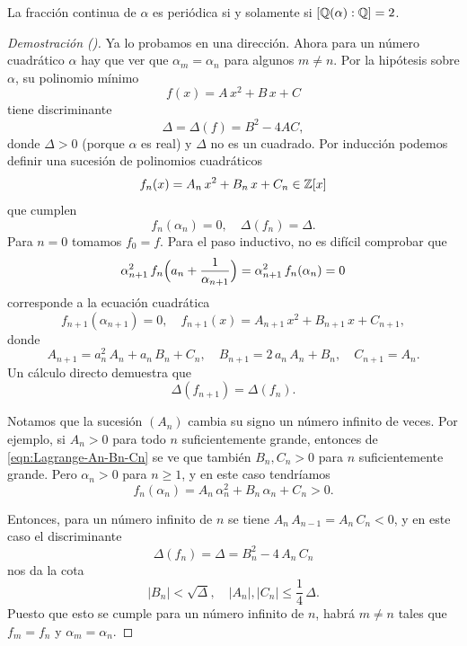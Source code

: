 \begin{teorema}[Lagrange]
  La fracción continua de $\alpha$ es periódica si y solamente si
  $[\mathbb{Q} (\alpha) : \mathbb{Q}] = 2$.

  \begin{proof}[Demostración (\cite{Steinig-1992})]
    Ya lo probamos en una dirección. Ahora para un número cuadrático $\alpha$
    hay que ver que $\alpha_m = \alpha_n$ para algunos $m \ne n$. Por la
    hipótesis sobre $\alpha$, su polinomio mínimo
    $$f (x) = A\,x^2 + B\,x + C$$
    tiene discriminante
    $$\Delta = \Delta (f) = B^2 - 4 A C,$$
    donde $\Delta > 0$ (porque $\alpha$ es real) y $\Delta$ no es un cuadrado.
    Por inducción podemos definir una sucesión de polinomios cuadráticos
    $$f_n (x) = A_n\,x^2 + B_n\,x + C_n \in \mathbb{Z} [x]$$
    que cumplen
    $$f_n (\alpha_n) = 0, \quad \Delta (f_n) = \Delta.$$
    Para $n = 0$ tomamos $f_0 = f$. Para el paso inductivo, no es difícil
    comprobar que
    $$\alpha_{n+1}^2 \, f_n \Bigl(a_n + \frac{1}{\alpha_{n+1}}\Bigr) = \alpha_{n+1}^2 \, f_n (\alpha_n) = 0$$
    corresponde a la ecuación cuadrática
    \[ f_{n+1} (\alpha_{n+1}) = 0, \quad
       f_{n+1} (x) = A_{n+1}\,x^2 + B_{n+1}\,x + C_{n+1}, \]
    donde
    \begin{equation}
      \label{eqn:Lagrange-An-Bn-Cn}
      A_{n+1} = a_n^2\,A_n + a_n\,B_n + C_n, \quad
      B_{n+1} = 2\,a_n\,A_n + B_n, \quad
      C_{n+1} = A_n.
    \end{equation}
    Un cálculo directo demuestra que
    $$\Delta (f_{n+1}) = \Delta (f_n).$$

    Notamos que la sucesión $(A_n)$ cambia su signo un número infinito de
    veces. Por ejemplo, si $A_n > 0$ para todo $n$ suficientemente grande,
    entonces de \eqref{eqn:Lagrange-An-Bn-Cn} se ve que también $B_n, C_n > 0$
    para $n$ suficientemente grande. Pero $\alpha_n > 0$ para $n \ge 1$, y en
    este caso tendríamos
    $$f_n (\alpha_n) = A_n\,\alpha_n^2 + B_n\,\alpha_n + C_n > 0.$$

    Entonces, para un número infinito de $n$ se tiene
    $A_n\,A_{n-1} = A_n\,C_n < 0$, y en este caso el discriminante
    $$\Delta (f_n) = \Delta = B_n^2 - 4\,A_n\,C_n$$
    nos da la cota
    $$|B_n| < \sqrt{\Delta}, \quad |A_n|, |C_n| \le \frac{1}{4}\,\Delta.$$
    Puesto que esto se cumple para un número infinito de $n$, habrá $m\ne n$
    tales que $f_m = f_n$ y $\alpha_m = \alpha_n$.
  \end{proof}
\end{teorema}

